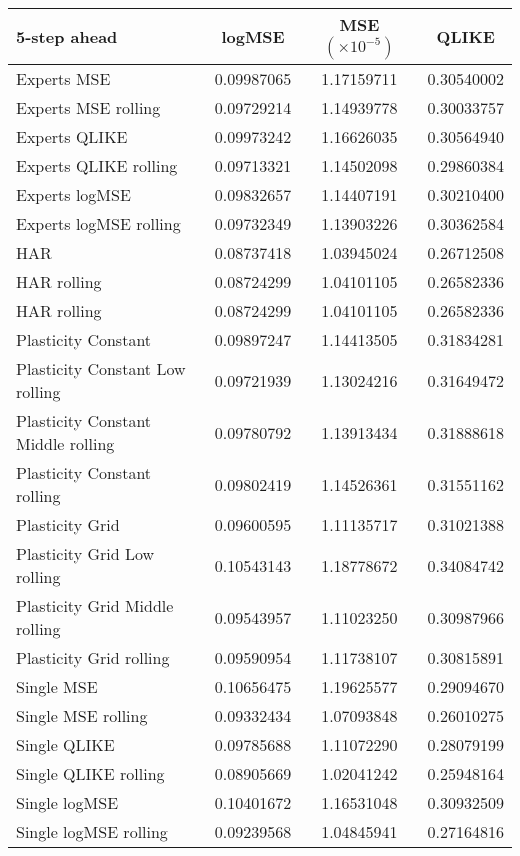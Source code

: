 
\begin{tabular}{l|c|c|c}
5-step ahead     & logMSE & MSE $(\times 10^{-5})$ & QLIKE \\\hline
Experts MSE & 0.09987065 & 1.17159711 & 0.30540002\\ 
Experts MSE rolling & 0.09729214 & 1.14939778 & 0.30033757\\ 
Experts QLIKE & 0.09973242 & 1.16626035 & 0.30564940\\ 
Experts QLIKE rolling & 0.09713321 & 1.14502098 & 0.29860384\\ 
Experts logMSE & 0.09832657 & 1.14407191 & 0.30210400\\ 
Experts logMSE rolling & 0.09732349 & 1.13903226 & 0.30362584\\ 
HAR & 0.08737418 & 1.03945024 & 0.26712508\\ 
HAR rolling & 0.08724299 & 1.04101105 & 0.26582336\\ 
HAR rolling & 0.08724299 & 1.04101105 & 0.26582336\\ 
Plasticity Constant & 0.09897247 & 1.14413505 & 0.31834281\\ 
Plasticity Constant Low rolling & 0.09721939 & 1.13024216 & 0.31649472\\ 
Plasticity Constant Middle rolling & 0.09780792 & 1.13913434 & 0.31888618\\ 
Plasticity Constant rolling & 0.09802419 & 1.14526361 & 0.31551162\\ 
Plasticity Grid & 0.09600595 & 1.11135717 & 0.31021388\\ 
Plasticity Grid Low rolling & 0.10543143 & 1.18778672 & 0.34084742\\ 
Plasticity Grid Middle rolling & 0.09543957 & 1.11023250 & 0.30987966\\ 
Plasticity Grid rolling & 0.09590954 & 1.11738107 & 0.30815891\\ 
Single MSE & 0.10656475 & 1.19625577 & 0.29094670\\ 
Single MSE rolling & 0.09332434 & 1.07093848 & 0.26010275\\ 
Single QLIKE & 0.09785688 & 1.11072290 & 0.28079199\\ 
Single QLIKE rolling & 0.08905669 & 1.02041242 & 0.25948164\\ 
Single logMSE & 0.10401672 & 1.16531048 & 0.30932509\\ 
Single logMSE rolling & 0.09239568 & 1.04845941 & 0.27164816\\ 
\end{tabular}